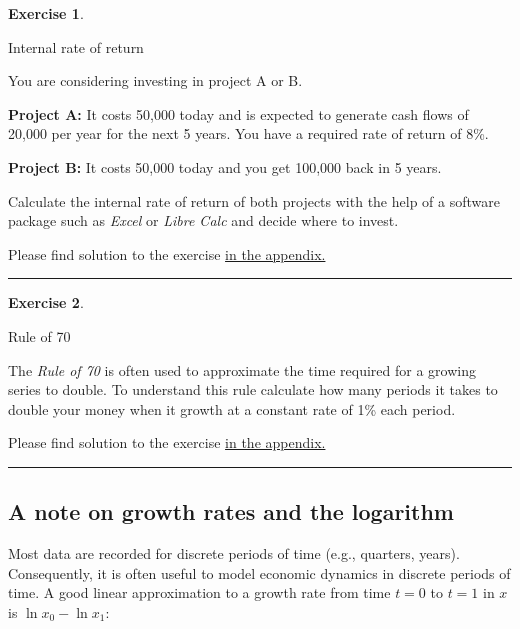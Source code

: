 \documentclass[
  12pt,
  oneside]{book}
\theoremstyle{definition}
\theoremstyle{definition}
\theoremstyle{definition}
\newtheorem{exercise}{Exercise}[chapter]
\theoremstyle{definition}
\theoremstyle{remark}
\begin{document}
\begin{exercise}
\protect\hypertarget{exr:irr}{}\label{exr:irr}

Internal rate of return

You are considering investing in project A or B.

\textbf{Project A:} It costs 50,000 today and is expected to generate cash flows of 20,000 per year for the next 5 years. You have a required rate of return of 8\%.

\textbf{Project B:} It costs 50,000 today and you get 100,000 back in 5 years.

Calculate the internal rate of return of both projects with the help of a software package such as \emph{Excel} or \emph{Libre Calc} and decide where to invest.

Please find solution to the exercise \protect\hyperlink{sol:irr}{in the appendix.}

\begin{center}\rule{0.5\linewidth}{0.5pt}\end{center}

\end{exercise}

\begin{exercise}
\protect\hypertarget{exr:rule70}{}\label{exr:rule70}

Rule of 70

The \emph{Rule of 70} is often used to approximate the time required for a growing series to double. To understand this rule calculate how many periods it takes to double your money when it growth at a constant rate of 1\% each period.

Please find solution to the exercise \protect\hyperlink{sol:rule70}{in the appendix.}

\begin{center}\rule{0.5\linewidth}{0.5pt}\end{center}

\end{exercise}

\hypertarget{a-note-on-growth-rates-and-the-logarithm}{%
\subsection{A note on growth rates and the logarithm}\label{a-note-on-growth-rates-and-the-logarithm}}

Most data are recorded for discrete periods of time (e.g., quarters, years). Consequently, it is often useful to model economic dynamics in discrete periods of time. A good linear approximation to a growth rate from time \(t=0\) to \(t=1\) in \(x\) is \(\ln x_0 - \ln x_1\):
\end{document}
